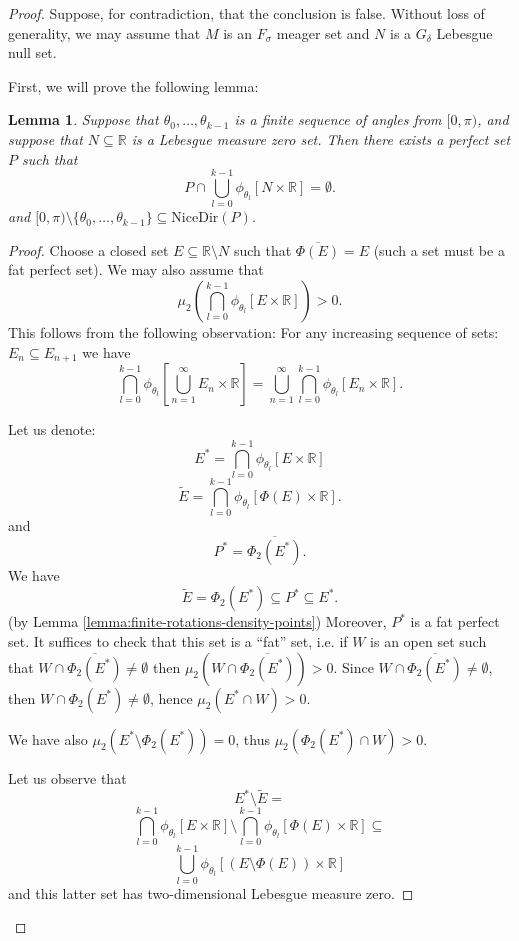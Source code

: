 \documentclass[12pt]{amsart}
\theoremstyle{plain}
\newtheorem{lemma}[theorem]{Lemma}
\theoremstyle{definition}
\theoremstyle{remark}
\newcommand{\real}{\mathbb{R}}
\newcommand{\NICEDIRECTIONS}{\mathrm{NiceDir}}
\begin{document}
\begin{proof}
  Suppose, for contradiction, that the conclusion is false.
  Without loss of generality, we may assume that
  $M$ is an $F_{\sigma}$ meager set and $N$ is a $G_{\delta}$
  Lebesgue null set.

  First, we will prove the following lemma:

  \begin{lemma}\label{lemma:main}
  Suppose that $\theta_0,\ldots,\theta_{k-1}$
  is a finite sequence of angles from $[0,\pi)$, and suppose that 
  $N \subseteq \real$ is a Lebesgue measure zero set.
  Then there exists a perfect set $P$ such that
  \[
     P \cap \bigcup_{l = 0}^{k-1} \phi_{\theta_l}[N \times \real] = \emptyset.
  \]
  and
    $[0, \pi) \setminus \lbrace \theta_0,\ldots,\theta_{k-1} \rbrace \subseteq \NICEDIRECTIONS(P)$.
  \end{lemma}
  
\begin{proof}
  Choose a closed set $E \subseteq \real\setminus N$
  such that $\overline{\Phi(E)} = E$ (such a set must be 
  a fat perfect set).
  We may also assume that
  \[
    \mu_2(\bigcap_{l = 0}^{k-1} \phi_{\theta_l}[E \times \real]) > 0.
  \]
  This follows from the following observation:
  For any increasing sequence of sets: $E_n \subseteq E_{n+1}$
  we have
  \[
    \bigcap_{l = 0}^{k-1} \phi_{\theta_l}[\bigcup_{n=1}^\infty E_n \times \real]
    = \bigcup_{n=1}^\infty
      \bigcap_{l = 0}^{k-1} \phi_{\theta_l}[E_n \times \real].
  \]

  Let us denote:
  \[
   E^* = \bigcap_{l = 0}^{k-1} \phi_{\theta_l}[E \times \real]
  \]
  \[
  \tilde{E} = \bigcap_{l = 0}^{k-1} \phi_{\theta_l}[\Phi(E) \times \real].
\]
and \[
P^* = \overline{\Phi_2(E^*)}.
\]
We have
\[
\tilde{E} = \Phi_2(E^*) \subseteq P^* \subseteq E^*.
\]
(by Lemma \ref{lemma:finite-rotations-density-points})
Moreover, $P^*$ is a fat perfect set.  
It suffices to check that this set is a ``fat'' set,
i.e. if $W$ is an open set such that $W \cap \overline{\Phi_2(E^*)} \not= \emptyset$
then $\mu_2(W \cap \overline{\Phi_2(E^*)}) > 0$. Since
$W \cap \overline{\Phi_2(E^*)} \not= \emptyset$, then
$W \cap \Phi_2(E^*) \not= \emptyset$, hence
$\mu_2(E^* \cap W) > 0$.

We have also
$\mu_2(E^* \setminus \Phi_2(E^*)) = 0$, thus
$\mu_2(\Phi_2(E^*) \cap W) > 0$.

Let us observe that
\[
  E^* \setminus \tilde{E} =\]
\[
  \bigcap_{l = 0}^{k-1} \phi_{\theta_l}[E \times \real] \setminus
  \bigcap_{l = 0}^{k-1} \phi_{\theta_l}[\Phi(E) \times \real] \subseteq
\]
\[
   \bigcup_{l = 0}^{k-1} \phi_{\theta_l}[(E \setminus \Phi(E)) \times \real]
\]
and this latter set has two-dimensional Lebesgue measure zero.


\end{proof}
\end{proof}
\end{document}
